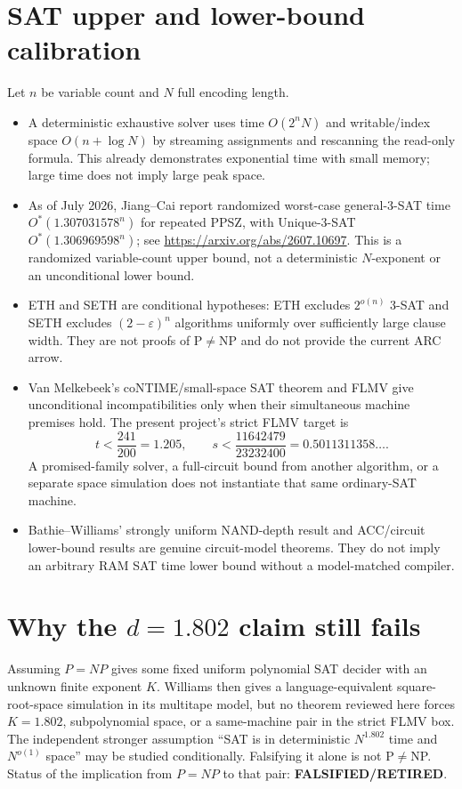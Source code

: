 \documentclass[11pt]{article}
\newcommand{\retired}{\textbf{FALSIFIED/RETIRED}}
\begin{document}
\section*{SAT upper and lower-bound calibration}
Let $n$ be variable count and $N$ full encoding length.
\begin{itemize}[leftmargin=*]
\item A deterministic exhaustive solver uses time $O(2^nN)$ and writable/index space
$O(n+\log N)$ by streaming assignments and rescanning the read-only formula.  This
already demonstrates exponential time with small memory; large time does not imply
large peak space.
\item As of July 2026, Jiang--Cai report randomized worst-case general-3-SAT time
$O^*(1.307031578^n)$ for repeated PPSZ, with Unique-3-SAT
$O^*(1.306969598^n)$; see \url{https://arxiv.org/abs/2607.10697}.
This is a randomized variable-count upper bound, not a deterministic $N$-exponent or
an unconditional lower bound.
\item ETH and SETH are conditional hypotheses: ETH excludes $2^{o(n)}$ 3-SAT and SETH
excludes $(2-\varepsilon)^n$ algorithms uniformly over sufficiently large clause
width.  They are not proofs of P$\ne$NP and do not provide the current ARC arrow.
\item Van Melkebeek's coNTIME/small-space SAT theorem and FLMV give unconditional
incompatibilities only when their simultaneous machine premises hold.  The present
project's strict FLMV target is
\[
 t<\frac{241}{200}=1.205,
 \qquad s<\frac{11642479}{23232400}=0.5011311358\ldots .
\]
A promised-family solver, a full-circuit bound from another algorithm, or a separate
space simulation does not instantiate that same ordinary-SAT machine.
\item Bathie--Williams' strongly uniform NAND-depth result and ACC/circuit lower-bound
results are genuine circuit-model theorems.  They do not imply an arbitrary RAM SAT
time lower bound without a model-matched compiler.
\end{itemize}

\section*{Why the $d=1.802$ claim still fails}
Assuming $P=NP$ gives some fixed uniform polynomial SAT decider with an unknown finite
exponent $K$.  Williams then gives a language-equivalent square-root-space simulation
in its multitape model, but no theorem reviewed here forces $K=1.802$, subpolynomial
space, or a same-machine pair in the strict FLMV box.  The independent stronger
assumption ``SAT is in deterministic $N^{1.802}$ time and $N^{o(1)}$ space'' may be
studied conditionally.  Falsifying it alone is not P$\ne$NP.  Status of the implication
from $P=NP$ to that pair: \retired.
\end{document}
